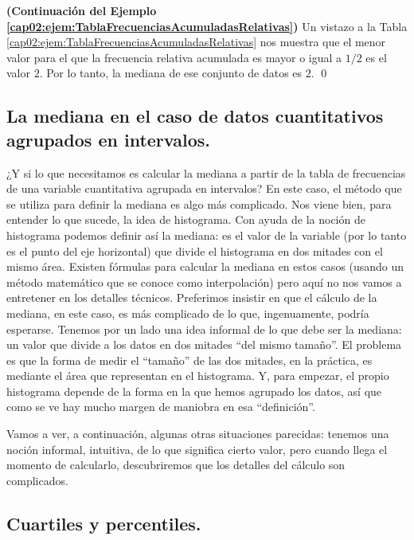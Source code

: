 \begin{ejemplo}
\label{cap02:ejem:TablaFrecuenciasAcumuladasRelativas02}
{\bf (Continuación del Ejemplo \ref{cap02:ejem:TablaFrecuenciasAcumuladasRelativas})}
Un vistazo a la Tabla \ref{cap02:ejem:TablaFrecuenciasAcumuladasRelativas} nos muestra que el menor valor para el que la frecuencia relativa acumulada es mayor o igual a $1/2$ es el valor $2$. Por lo tanto, la mediana de ese conjunto de datos es $2$.
\qed
\end{ejemplo}



\subsection{La mediana en el caso de datos cuantitativos agrupados en intervalos.}
\label{cap02:subsec:MedianaDatosAgrupadosIntervalos}

¿Y si lo que necesitamos es {\sf calcular la mediana a partir de la tabla de
frecuencias de una variable cuantitativa agrupada en intervalos}? En este caso,
el método que se utiliza para definir la mediana es algo más complicado. Nos
viene bien, para entender lo que sucede, la idea de histograma. Con ayuda de la
noción de histograma podemos definir así la mediana: es el valor de la variable
(por lo tanto es el punto del eje horizontal) que divide el histograma en dos
mitades con el mismo área. Existen fórmulas para calcular la mediana en estos
casos (usando un método matemático que se conoce como interpolación) pero aquí
no nos vamos a entretener en los detalles técnicos. Preferimos insistir en que
el cálculo de la mediana, en este caso, es más complicado de lo que,
ingenuamente, podría esperarse. Tenemos por un lado una idea informal de lo que
debe ser  la mediana: un valor que divide a los datos en dos mitades ``del
mismo tamaño''. El problema es que la forma de medir el ``tamaño'' de las dos
mitades, en la práctica, es mediante el área que representan en el histograma. Y, para empezar, el propio histograma depende de la forma en la que hemos agrupado los datos, así que como se ve hay mucho margen de maniobra en esa ``definición''.

Vamos a ver, a continuación, algunas otras situaciones parecidas: tenemos una
noción informal, intuitiva, de lo que significa cierto valor, pero cuando llega
el momento de calcularlo, descubriremos que los detalles del cálculo son
complicados.

\subsection{Cuartiles y percentiles.}
\label{cap02:subsec:CuartilesPercentiles}

